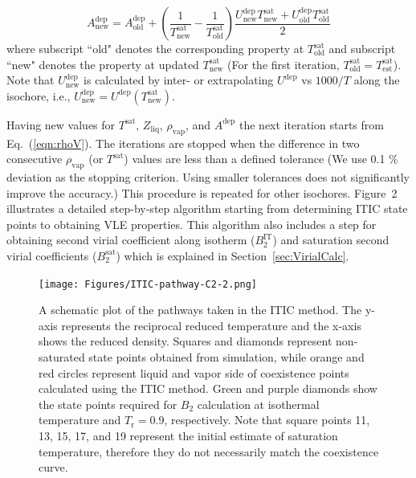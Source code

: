 \documentclass[5p,times]{elsarticle}
\begin{document}
\begin{equation}
A^\mathrm{dep}_\mathrm{new} = A^\mathrm{dep}_\mathrm{old} + \left( \frac{1}{T^\mathrm{sat}_\mathrm{new}}-\frac{1}{T^\mathrm{sat}_\mathrm{old}} \right) \frac{U^\mathrm{dep}_\mathrm{new}T^\mathrm{sat}_\mathrm{new}+U^\mathrm{dep}_\mathrm{old}T^\mathrm{sat}_\mathrm{old}}{2} 
\label{eqn:aDepCorrection}
\end{equation}
where subscript ``old" denotes the corresponding property at $T^\mathrm{sat}_\mathrm{old}$ and subscript ``new" denotes the property at updated $T^\mathrm{sat}_\mathrm{new}$ (For the first iteration, $T^\mathrm{sat}_\mathrm{old} = T^\mathrm{sat}_\mathrm{est}$). Note that $U^\mathrm{dep}_\mathrm{new}$ is calculated by inter- or extrapolating $U^\mathrm{dep}$ vs $1000/T$ along the isochore, i.e., $U^\mathrm{dep}_\mathrm{new} = U^\mathrm{dep}(T^\mathrm{sat}_\mathrm{new})$.

Having new values for $T^\mathrm{sat}$, $Z_{\mathrm{liq}}$, $\rho_\mathrm{vap}$, and $A^\mathrm{dep}$ the next iteration starts from Eq.~(\ref{eqn:rhoV}). The iterations are stopped when the difference in two consecutive $\rho_\mathrm{vap}$ (or $T^\mathrm{sat}$) values are less than a defined tolerance (We use 0.1 \% deviation as the stopping criterion. Using smaller tolerances does not significantly improve the accuracy.) This procedure is repeated for other isochores. Figure~2 illustrates a detailed step-by-step algorithm starting from determining ITIC state points to obtaining VLE properties. This algorithm also includes a step for obtaining second virial coefficient along isotherm ($B_2^\mathrm{IT}$) and saturation second virial coefficients ($B_2^\mathrm{sat}$) which is explained in Section~\ref{sec:VirialCalc}.
\begin{figure}
\texttt{[image: Figures/ITIC-pathway-C2-2.png]}
\caption{A schematic plot of the pathways taken in the ITIC method. The y-axis represents the reciprocal reduced temperature and the x-axis shows the reduced density. Squares and diamonds represent non-saturated state points obtained from simulation, while orange and red circles represent liquid and vapor side of coexistence points calculated using the ITIC method. Green and purple diamonds show the state points required for $B_2$ calculation at isothermal temperature and $T_\mathrm{r}=0.9$, respectively. Note that square points 11, 13, 15, 17, and 19 represent the initial estimate of saturation temperature, therefore they do not necessarily match the coexistence curve.}
\label{fig:ITICpathway}
\end{figure}
\end{document}

